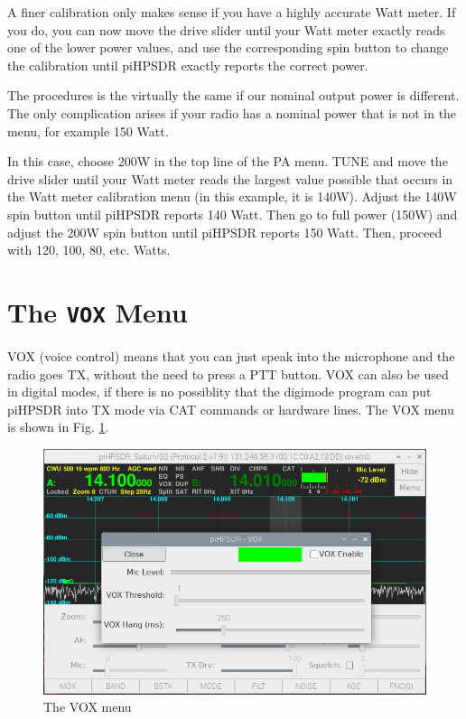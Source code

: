 \documentclass[12pt]{book}
\begin{document}
A finer calibration only makes sense if you have a highly accurate Watt meter. If you do,
you can now move the drive slider until your Watt meter exactly reads one of the
lower power values, and use the corresponding spin button to change the calibration
until piHPSDR exactly reports the correct power.

The procedures is the virtually the same if our nominal output power is different.
The only complication arises if your radio has a nominal power that is not in the menu,
for example 150 Watt.

In this case, choose 200W in the top line of the PA menu. TUNE and move the drive
slider until your Watt meter reads the largest value possible that occurs
in the Watt meter calibration menu (in this example, it is 140W). Adjust the
140W spin button until piHPSDR reports 140 Watt. Then go to full power
(150W) and adjust the 200W spin button until piHPSDR reports 150 Watt.
Then, proceed with 120, 100, 80, etc. Watts.

\section{The \texttt{VOX} Menu}

VOX (voice control) means that you can just speak into the microphone and the
radio goes TX, without the need to press a PTT button. VOX can also be used
in digital modes, if there is no possiblity that the digimode program can
put piHPSDR into TX mode via CAT commands or hardware lines. The VOX menu
is shown in Fig. \ref{fig:VOXMenu}.

\begin{figure}[ht]
\center
\includegraphics[width=12cm]{VOXMenu.png}
\caption{The VOX menu}
\label{fig:VOXMenu}
\end{figure}
\end{document}
